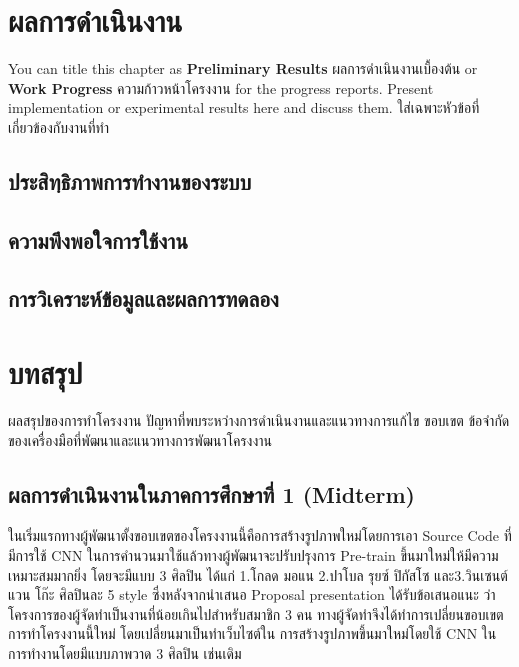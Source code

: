 \documentclass[12pt,oneside,openright,a4paper]{cpe-thai-project}
\begin{document}
\chapter{ผลการดำเนินงาน}

You can title this chapter as \textbf{Preliminary Results} ผลการดำเนินงานเบื้องต้น or \textbf{Work Progress} ความก้าวหน้าโครงงาน for the progress reports. Present implementation or experimental results here and discuss them.
ใส่เฉพาะหัวข้อที่เกี่ยวข้องกับงานที่ทำ 

\section{ประสิทฺธิภาพการทำงานของระบบ} 
\section{ความพึงพอใจการใช้งาน}
\section{การวิเคราะห์ข้อมูลและผลการทดลอง}




\chapter{บทสรุป}

ผลสรุปของการทำโครงงาน ปัญหาที่พบระหว่างการดำเนินงานและแนวทางการแก้ไข ขอบเขต ข้อจำกัดของเครื่องมือที่พัฒนาและแนวทางการพัฒนาโครงงาน

\section{ผลการดำเนินงานในภาคการศึกษาที่ 1 (Midterm)}
ในเริ่มแรกทางผู้พัฒนาตั้งขอบเขตของโครงงานนี้คือการสร้างรูปภาพใหม่โดยการเอา Source Code ที่มีการใช้ CNN ในการคำนวนมาใช้แล้วทางผู้พัฒนาจะปรับปรุงการ Pre-train ขึ้นมาใหม่ให้มีความเหมาะสมมากยิ่ง โดยจะมีแบบ 3 ศิลปิน ได้แก่ 1.โกลด มอแน 2.ปาโบล รุยซ์ ปิกัสโซ และ3.วินเซนต์ แวน โก๊ะ ศิลปินละ 5 style ซึ่งหลังจากนำเสนอ Proposal presentation ได้รับข้อเสนอแนะ ว่าโครงการของผู้จัดทำเป็นงานที่น้อยเกินไปสำหรับสมาชิก 3 คน ทางผู้จัดทำจึงได้ทำการเปลี่ยนขอบเขตการทำโครงงานนี้ใหม่ โดยเปลี่ยนมาเป็นทำเว็บไซต์ใน การสร้างรูปภาพขึ้นมาใหม่โดยใช้ CNN ในการทำงานโดยมีแบบภาพวาด 3 ศิลปิน เช่นเดิม 
\end{document}
